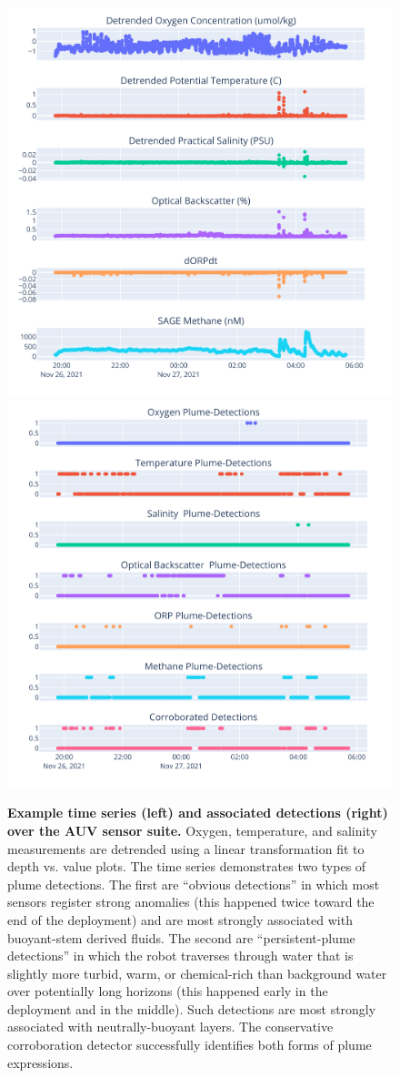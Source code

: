 \begin{figure}[h!]
    \centering
    \includegraphics[width=0.45\columnwidth]{figures/binary_example_time.png}
    \hspace{.1in}
    \includegraphics[width=0.45\columnwidth]{figures/binary_example_detections.png}
    \caption[Example time series (left) and associated detections (right) over the AUV \Sentry sensor suite.]{\textbf{Example time series (left) and associated detections (right) over the AUV \Sentry sensor suite.} Oxygen, temperature, and salinity measurements are detrended using a linear transformation fit to depth vs. value plots. The time series demonstrates two types of plume detections. The first are ``obvious detections'' in which most sensors register strong anomalies (this happened twice toward the end of the deployment) and are most strongly associated with buoyant-stem derived fluids. The second are ``persistent-plume detections'' in which the robot traverses through water that is slightly more turbid, warm, or chemical-rich than background water over potentially long horizons (this happened early in the deployment and in the middle). Such detections are most strongly associated with neutrally-buoyant layers. The conservative corroboration detector successfully identifies both forms of plume expressions.}
    \label{fig:detection_example}
\end{figure}

